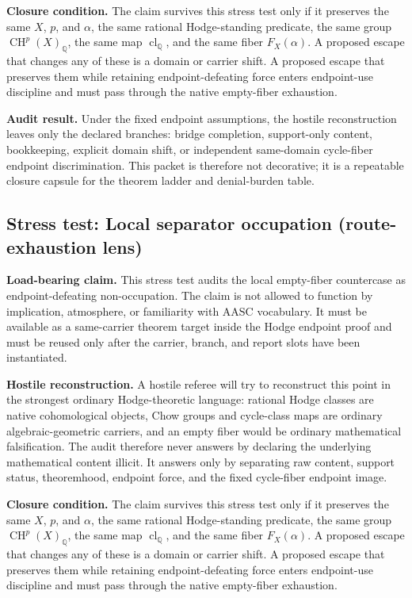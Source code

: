 \documentclass[11pt]{article}
\newcommand{\QQ}{\mathbb{Q}}
\newcommand{\CH}{\operatorname{CH}}
\newcommand{\clQ}{\operatorname{cl}_{\QQ}}
\begin{document}
\par\noindent\textbf{Closure condition.} The claim survives this stress test only if it preserves the same $X$, $p$, and $\alpha$, the same rational Hodge-standing predicate, the same group $\CH^p(X)_\QQ$, the same map $\clQ$, and the same fiber $F_X(\alpha)$. A proposed escape that changes any of these is a domain or carrier shift. A proposed escape that preserves them while retaining endpoint-defeating force enters endpoint-use discipline and must pass through the native empty-fiber exhaustion.

\par\noindent\textbf{Audit result.} Under the fixed endpoint assumptions, the hostile reconstruction leaves only the declared branches: bridge completion, support-only content, bookkeeping, explicit domain shift, or independent same-domain cycle-fiber endpoint discrimination. This packet is therefore not decorative; it is a repeatable closure capsule for the theorem ladder and denial-burden table.


\subsection{Stress test: Local separator occupation (route-exhaustion lens)}

\par\noindent\textbf{Load-bearing claim.} This stress test audits the local empty-fiber countercase as endpoint-defeating non-occupation. The claim is not allowed to function by implication, atmosphere, or familiarity with AASC vocabulary. It must be available as a same-carrier theorem target inside the Hodge endpoint proof and must be reused only after the carrier, branch, and report slots have been instantiated.

\par\noindent\textbf{Hostile reconstruction.} A hostile referee will try to reconstruct this point in the strongest ordinary Hodge-theoretic language: rational Hodge classes are native cohomological objects, Chow groups and cycle-class maps are ordinary algebraic-geometric carriers, and an empty fiber would be ordinary mathematical falsification. The audit therefore never answers by declaring the underlying mathematical content illicit. It answers only by separating raw content, support status, theoremhood, endpoint force, and the fixed cycle-fiber endpoint image.

\par\noindent\textbf{Closure condition.} The claim survives this stress test only if it preserves the same $X$, $p$, and $\alpha$, the same rational Hodge-standing predicate, the same group $\CH^p(X)_\QQ$, the same map $\clQ$, and the same fiber $F_X(\alpha)$. A proposed escape that changes any of these is a domain or carrier shift. A proposed escape that preserves them while retaining endpoint-defeating force enters endpoint-use discipline and must pass through the native empty-fiber exhaustion.
\end{document}
